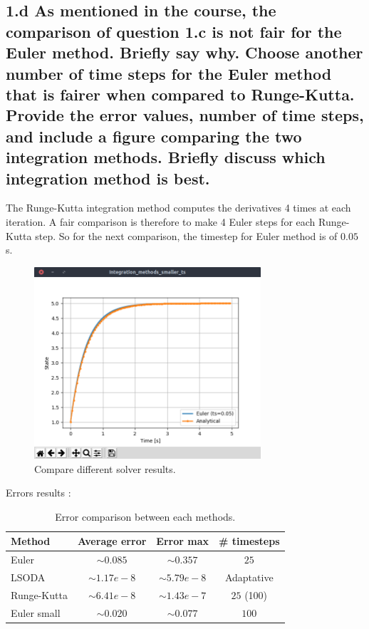 \documentclass{cmc}
\begin{document}
\subsection*{1.d As mentioned in the course, the comparison of question 1.c is
  not fair for the Euler method.  Briefly say why. Choose another number of time
  steps for the Euler method that is fairer when compared to
  Runge-Kutta. Provide the error values, number of time steps, and include a
  figure comparing the two integration methods. Briefly discuss which
  integration method is best.}

The Runge-Kutta integration method computes the derivatives 4 times at each iteration. A fair comparison is therefore to make 4 Euler steps for each Runge-Kutta step. So for the next comparison, the timestep for Euler method is of $0.05$ s.

\begin{figure}[H]
	\centering
  	\includegraphics[width=0.75\textwidth,trim={0 1.25cm 0 0},clip]{figures/ex1_euler_small_ts.png}
  	\caption{Compare different solver results.}
  	\label{fig:ex1_tests_solver}
\end{figure}

Errors results :

\begin{table}[H]
\centering
\caption{Error comparison between each methods.}
	\begin{tabular}{lccc}
		\hline
		\textbf{Method} & \textbf{Average error} & \textbf{Error max} & \textbf{\# timesteps} \\ \hline \hline
		Euler & $\sim 0.085$ & $\sim 0.357$ & $25$ \\
		LSODA & $\sim 1.17 e-8$ & $\sim 5.79 e-8$ & Adaptative \\
		Runge-Kutta & $\sim 6.41 e-8$ & $\sim 1.43e-7$ & $25$ (100) \\
		Euler small & $\sim 0.020$ & $\sim 0.077$ & $100$ \\ \hline
	\end{tabular}
\end{table}
\end{document}
